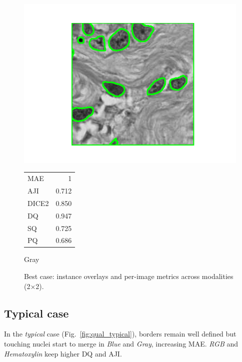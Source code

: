 \documentclass[target=bach,aauheader=,style=]{thud}
\begin{document}
\begin{figure}[ht]
\begin{minipage}{0.48\textwidth}
  \includegraphics[width=\linewidth]{imgs/qualitative/best/Gray/contour_img.png}\\[-1ex]
  \footnotesize
  \begin{tabular}{@{}lr@{}}
   MAE & 1\\ AJI & 0.712\\ DICE2 & 0.850\\
   DQ & 0.947\\ SQ & 0.725\\ PQ & 0.686
  \end{tabular}
  \caption*{Gray}
\end{minipage}

\caption{Best case: instance overlays and per-image metrics across modalities (2×2).}
\label{fig:qual_best}
\end{figure}

\subsection{Typical case}
In the \emph{typical} case (Fig.~\ref{fig:qual_typical}), borders remain well defined but touching nuclei start to merge in \emph{Blue} and \emph{Gray}, increasing MAE. \emph{RGB} and \emph{Hematoxylin} keep higher DQ and AJI.
\end{document}
